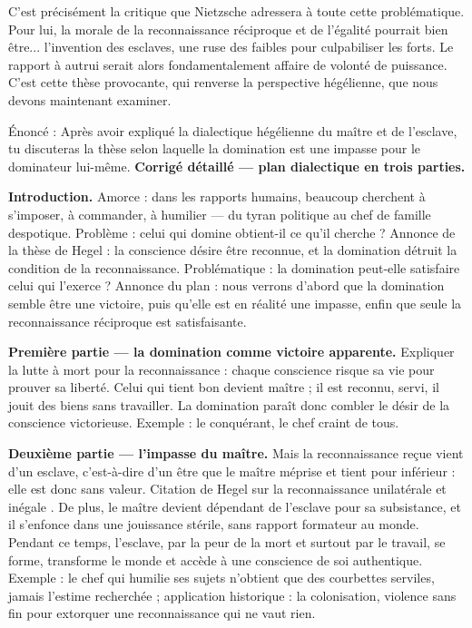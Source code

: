 \documentclass[11pt]{article}
\newcommand{\cle}[1]{{\popxbold\color{popdark}#1}}
\begin{document}
C'est précisément la critique que Nietzsche adressera à toute cette problématique. Pour lui, la morale de la reconnaissance réciproque et de l'égalité pourrait bien être... l'invention des esclaves, une ruse des faibles pour culpabiliser les forts. Le rapport à autrui serait alors fondamentalement affaire de \cle{volonté de puissance}. C'est cette thèse provocante, qui renverse la perspective hégélienne, que nous devons maintenant examiner.

\begin{exoresolu}
Énoncé : Après avoir expliqué la dialectique hégélienne du maître et de l'esclave, tu discuteras la thèse selon laquelle la domination est une impasse pour le dominateur lui-même.
\tcblower
\textbf{Corrigé détaillé — plan dialectique en trois parties.}

\textbf{Introduction.} Amorce : dans les rapports humains, beaucoup cherchent à s'imposer, à commander, à humilier — du tyran politique au chef de famille despotique. Problème : celui qui domine obtient-il ce qu'il cherche ? Annonce de la thèse de Hegel : la conscience désire être reconnue, et la domination détruit la condition de la reconnaissance. Problématique : la domination peut-elle satisfaire celui qui l'exerce ? Annonce du plan : nous verrons d'abord que la domination semble être une victoire, puis qu'elle est en réalité une impasse, enfin que seule la reconnaissance réciproque est satisfaisante.

\textbf{Première partie — la domination comme victoire apparente.} Expliquer la lutte à mort pour la reconnaissance : chaque conscience risque sa vie pour prouver sa liberté. Celui qui tient bon devient maître ; il est reconnu, servi, il jouit des biens sans travailler. La domination paraît donc combler le désir de la conscience victorieuse. Exemple : le conquérant, le chef craint de tous.

\textbf{Deuxième partie — l'impasse du maître.} Mais la reconnaissance reçue vient d'un esclave, c'est-à-dire d'un être que le maître méprise et tient pour inférieur : elle est donc sans valeur. Citation de Hegel sur la \guillemotleft reconnaissance unilatérale et inégale \guillemotright. De plus, le maître devient dépendant de l'esclave pour sa subsistance, et il s'enfonce dans une jouissance stérile, sans rapport formateur au monde. Pendant ce temps, l'esclave, par la peur de la mort et surtout par le travail, se forme, transforme le monde et accède à une conscience de soi authentique. Exemple : le chef qui humilie ses sujets n'obtient que des courbettes serviles, jamais l'estime recherchée ; application historique : la colonisation, violence sans fin pour extorquer une reconnaissance qui ne vaut rien.


\end{exoresolu}
\end{document}
